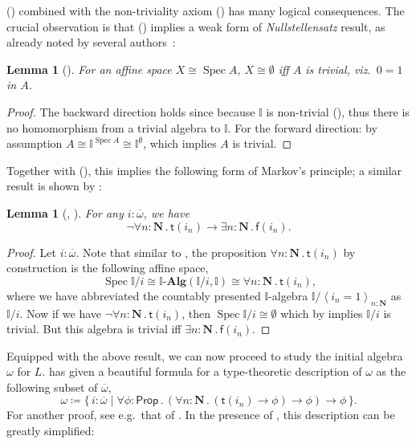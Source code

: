 \documentclass[a4paper,12pt]{amsart}
\newtheorem{lemma}[theorem]{Lemma}
\theoremstyle{definition}
\newcommand{\mb}[1]{\mathbf{#1}}
\newcommand{\mbb}[1]{\mathbb{#1}}
\newcommand{\I}{\mbb I}
\newcommand{\ms}[1]{\mathsf{#1}}
\newcommand{\alg}{\text{-}\mb{Alg}}
\newcommand{\ov}[1]{\overline{#1}}
\newcommand{\pair}[1]{\left\langle#1\right\rangle}
\newcommand{\scomp}[2]{\{\,#1\mid#2\,\}}
\newcommand{\N}{\mb N}
\newcommand{\fa}[2]{\forall #1\!\colon\!\!#2\mathpunct{.}}
\newcommand{\ex}[2]{\exists #1\!\colon\!\!#2\mathpunct{.}}
\newcommand{\emp}{\emptyset}
\newcommand{\pp}{\ms{Prop}}
\newcommand{\spec}{\operatorname{Spec}}
\newcommand\istsym{\ms{t}}
\newcommand\isfsym{\ms{f}}
\newcommand\ist[1]{\istsym(#1)}
\newcommand\isf[1]{\isfsym(#1)}
\begin{document}
(\AxiomSQCC) combined with the non-triviality axiom (\AxiomNT) has many logical consequences. The crucial observation is that (\AxiomNT) implies a weak form of \emph{Nullstellensatz} result, as already noted by several authors~\citep{blechschmidt2021using,blechschmidt2020general,Cherubini_Coquand_Hutzler_2024}:

\begin{lemma}[\AxiomNT]\label{lem:nulls}
  For an affine space $X \cong \spec A$, $X \cong \emp$ iff $A$ is trivial, viz.\ $0=1$ in $A$.
\end{lemma}
\begin{proof}
  The backward direction holds since because $\I$ is non-trivial (\AxiomNT), thus there is no homomorphism from a trivial algebra to $\I$. For the forward direction: by assumption $A \cong \I^{\spec A} \cong \I^\emp$, which implies $A$ is trivial. 
\end{proof}

Together with (\AxiomSQCC), this implies the following form of Markov's principle; a similar result is shown by \citet{cherubini2024foundation}:

\begin{lemma}[\AxiomNT, \AxiomSQCC]\label{lem:markov}
  For any $i : \ov\omega$, we have
  \[ \neg\fa{n}{\N}\ist{i_n} \to \ex n\N\isf{i_n}\text{.} \]
\end{lemma}
\begin{proof}
  Let $i : \ov\omega$. Note that similar to , the proposition $\fa n\N \ist{i_n}$ by construction is the following affine space, 
  \[ \spec\I/i \cong \I\alg(\I/i,\I) \cong \fa n\N \ist{i_n}\text{,} \]
  where we have abbreviated the countably presented $\I$-algebra $\I/\pair{i_n=1}_{n:\N}$ as $\I/i$. Now if we have $\neg\fa n\N \ist{i_n}$, then $\spec\I/i \cong \emp$ which by  implies $\I/i$ is trivial. But this algebra is trivial iff $\ex n\N \isf{i_n}$.
\end{proof}

Equipped with the above result, we can now proceed to study the initial algebra $\omega$ for $L$. \citet{JIBLADZE1997185} has given a beautiful formula for a type-theoretic description of $\omega$ as the following subset of $\ov\omega$, 
\[ \omega \coloneq \scomp{i : \ov\omega}{\fa\phi{\pp} (\fa n{\N} (\ist{i_n} \to \phi) \to \phi) \to \phi}\text{.} \]
For another proof, see e.g.\ that of \citet{VANOOSTEN2000233}. In the presence of , this description can be greatly simplified:
\end{document}

